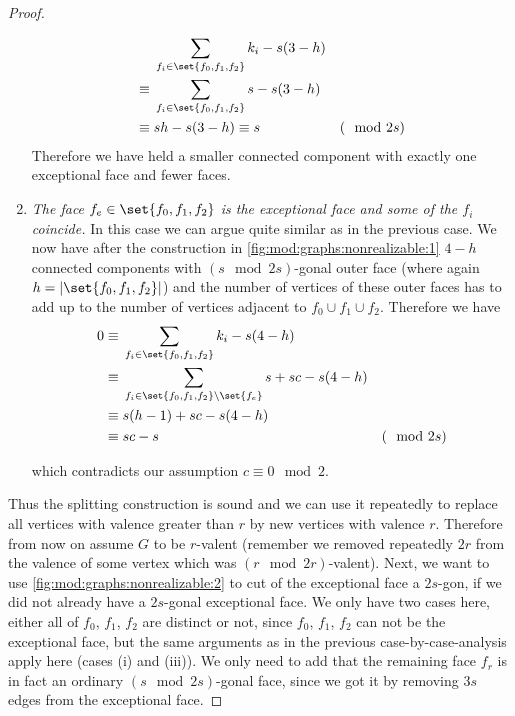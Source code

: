 \begin{proposition}
\begin{proof}
\begin{enumerate}
    \begin{align*}
      &\sum_{f_i \in \set{f_0, f_1, f_2}} k_i - s(3 - h) \\
      \equiv{}& \sum_{f_i \in \set{f_0, f_1, f_2}} s - s(3 - h) \\
      \equiv{}& s h - s(3 - h) \equiv s &(\mod 2s)
    \end{align*}
    Therefore we have held a smaller connected component with exactly one exceptional face and fewer faces.
  \item {\it The face $f_e \in \set{f_0, f_1, f_2}$ is the exceptional face and some of the $f_i$ coincide.} In this case we can argue quite similar as in the previous case. We now have after the construction in \autoref{fig:mod:graphs:nonrealizable:1} $4 - h$ connected components with $(s \mod 2s)$-gonal outer face (where again $h = |\set{f_0, f_1, f_2}|$) and the number of vertices of these outer faces has to add up to the number of vertices adjacent to $f_0 \cup f_1 \cup f_2$. Therefore we have
    \begin{align*}
      0{}\equiv{}&\sum_{f_i \in \set{f_0, f_1, f_2}} k_i - s(4 - h) \\
      \equiv{}& \sum_{f_i \in \set{f_0, f_1, f_2} \setminus \set{f_e}} s + sc - s(4 - h) \\
      \equiv{}& s(h - 1) + sc - s(4 - h) \\
      \equiv{}& sc - s  &(\mod 2s)
    \end{align*}

    which contradicts our assumption $c \equiv 0 \mod 2$.
  \end{enumerate}

  Thus the splitting construction is sound and we can use it repeatedly to replace all vertices with valence greater than $r$ by new vertices with valence $r$. Therefore from now on assume $G$ to be $r$-valent (remember we removed repeatedly $2r$ from the valence of some vertex which was $(r \mod 2r)$-valent). Next, we want to use \autoref{fig:mod:graphs:nonrealizable:2} to cut of the exceptional face a $2s$-gon, if we did not already have a $2s$-gonal exceptional face. We only have two cases here, either all of $f_0$, $f_1$, $f_2$ are distinct or not, since $f_0$, $f_1$, $f_2$ can not be the exceptional face, but the same arguments as in the previous case-by-case-analysis apply here (cases (i) and (iii)). We only need to add that the remaining face $f_r$ is in fact an ordinary $(s \mod 2s)$-gonal face, since we got it by removing $3s$ edges from the exceptional face.


\end{proof}
\end{proposition}

